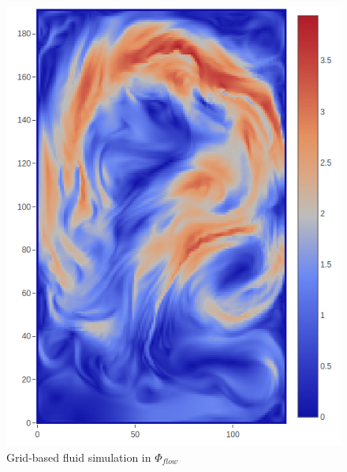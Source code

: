 \begin{figure}[t]
    \centering
	\includegraphics[scale=0.85]{figures/phiflow}

	\caption{Grid-based fluid simulation in $\Phi_{flow}$}
\end{figure}